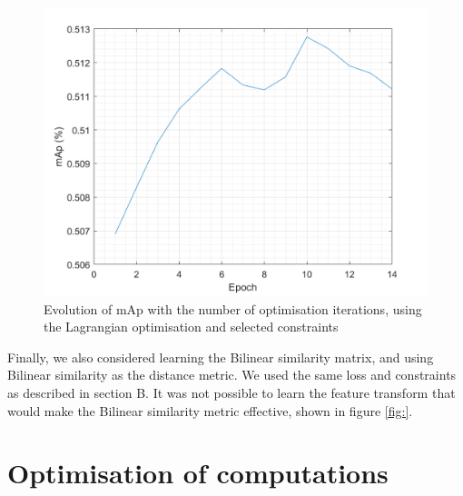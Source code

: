 \documentclass[10pt,technote]{IEEEtran}
\begin{document}
\begin{figure}
    \centering
    \includegraphics[width=\linewidth]{Graphs/no_kernel_Maha_I_newloss.png}
    \caption{Evolution of mAp with the number of optimisation iterations, using the Lagrangian optimisation and selected constraints}
    \label{fig:Lag_optim}
\end{figure}

Finally, we also considered learning the Bilinear similarity matrix, and using Bilinear similarity as the distance metric. We used the same loss and constraints as described in section B. It was not possible to learn the feature transform that would make the Bilinear similarity metric effective, shown in figure \ref{fig:}.



\appendices

\section{Optimisation of computations}
\end{document}

